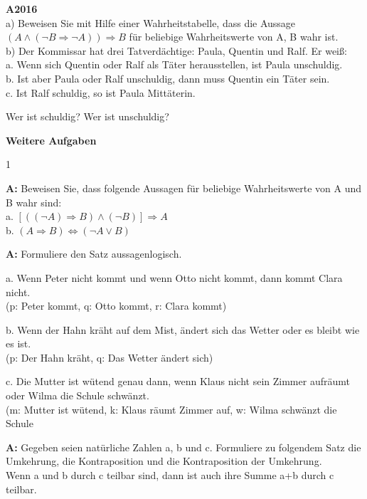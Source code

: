 \documentclass[landscape,twocolumn,a4paper]{article}
\begin{document}
\newpage

\textbf{A2016} \\

a) Beweisen Sie mit Hilfe einer Wahrheitstabelle, dass die Aussage
$(A \land ( \lnot B \Rightarrow \lnot A)) \Rightarrow B$
für beliebige Wahrheitswerte von A, B wahr ist. \\

b) Der Kommissar hat drei Tatverdächtige: Paula, Quentin und Ralf. Er weiß: \\
a. Wenn sich Quentin oder Ralf als Täter herausstellen, ist Paula unschuldig. \\
b. Ist aber Paula oder Ralf unschuldig, dann muss Quentin ein Täter sein. \\
c. Ist Ralf schuldig, so ist Paula Mittäterin.

Wer ist schuldig? Wer ist unschuldig?
\bigskip


\textbf{Weitere Aufgaben}
\bigskip

\setcounter {y} {1}


\textbf{A:}
Beweisen Sie, dass folgende Aussagen für beliebige Wahrheitswerte von A und B wahr sind: \\

a. $[((\lnot A) \Rightarrow B) \land (\lnot B)] \Rightarrow A$ \\
b. $(A \Rightarrow B) \Leftrightarrow (\lnot A \lor B)$
\bigskip {}

\textbf{A:} 
Formuliere den Satz aussagenlogisch.

a. Wenn Peter nicht kommt und wenn Otto nicht kommt, dann kommt Clara nicht. \\
(p: Peter kommt, q: Otto kommt, r: Clara kommt) 

b. Wenn der Hahn kräht auf dem Mist, ändert sich das Wetter oder es bleibt wie es ist. \\
(p: Der Hahn kräht, q: Das Wetter ändert sich)

c. Die Mutter ist wütend genau dann, wenn Klaus nicht sein Zimmer aufräumt oder Wilma die Schule schwänzt. \\
(m: Mutter ist wütend, k: Klaus räumt Zimmer auf, w: Wilma schwänzt die Schule
\bigskip {}

\textbf{A:} 
Gegeben seien natürliche Zahlen a, b und c.
Formuliere zu folgendem Satz die Umkehrung, die Kontraposition und die Kontraposition der Umkehrung. \\
Wenn a und  b durch c teilbar sind, dann ist auch ihre Summe a+b durch c teilbar.
\bigskip {}
\end{document}
